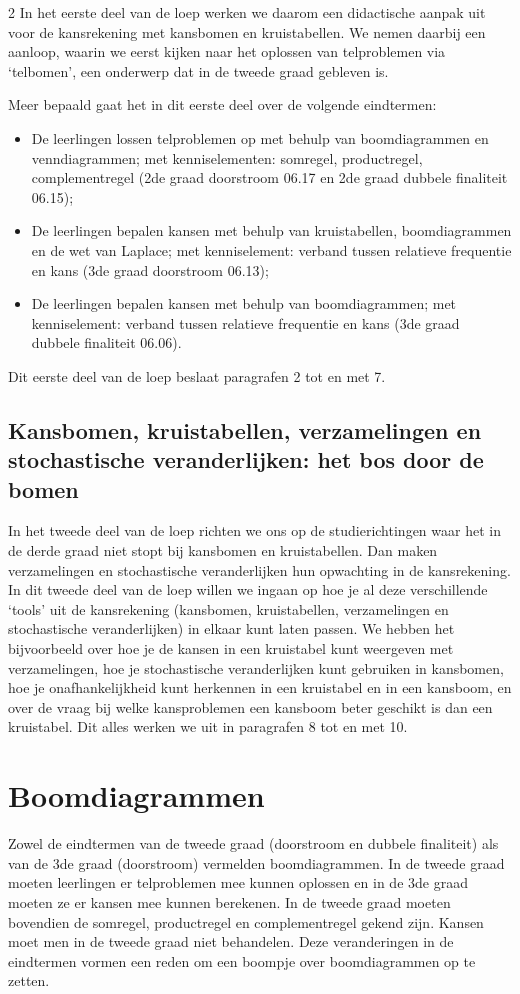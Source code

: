 \begin{multicols}{2}
In het eerste deel van de loep werken we daarom een didactische aanpak uit voor de kansrekening met kansbomen en kruistabellen. We nemen daarbij een aanloop, waarin we eerst kijken naar het oplossen van telproblemen via ‘telbomen’, een onderwerp dat in de tweede graad gebleven is.

Meer bepaald gaat het in dit eerste deel over de volgende eindtermen:
\begin{itemize}
    \item De leerlingen lossen telproblemen op met behulp van boomdiagrammen en venndiagrammen; met kenniselementen: somregel, productregel, complementregel (2de graad doorstroom 06.17 en 2de graad dubbele finaliteit 06.15);
    \item De leerlingen bepalen kansen met behulp van kruistabellen, boomdiagrammen en de wet van Laplace; met kenniselement: verband tussen relatieve frequentie en kans (3de graad doorstroom 06.13);
    \item De leerlingen bepalen kansen met behulp van boomdiagrammen; met kenniselement: verband tussen relatieve frequentie en kans (3de graad dubbele finaliteit 06.06).
\end{itemize}
Dit eerste deel van de loep beslaat paragrafen 2 tot en met 7.

\subsection*{Kansbomen, kruistabellen, verzamelingen en stochastische veranderlijken: het bos door de bomen}

In het tweede deel van de loep richten we ons op de studierichtingen waar het in de derde graad niet stopt bij kansbomen en kruistabellen. Dan maken verzamelingen en stochastische veranderlijken hun opwachting in de kansrekening. In dit tweede deel van de loep willen we ingaan op hoe je al deze verschillende ‘tools’ uit de kansrekening (kansbomen, kruistabellen, verzamelingen en stochastische veranderlijken) in elkaar kunt laten passen. We hebben het bijvoorbeeld over hoe je de kansen in een kruistabel kunt weergeven met verzamelingen, hoe je stochastische veranderlijken kunt gebruiken in kansbomen, hoe je onafhankelijkheid kunt herkennen in een kruistabel en in een kansboom, en over de vraag bij welke kansproblemen een kansboom beter geschikt is dan een kruistabel. Dit alles werken we uit in paragrafen 8 tot en met 10.

\section{Boomdiagrammen}
\label{par:boom}
Zowel de eindtermen van de tweede graad (doorstroom en dubbele finaliteit) als van de 3de graad (doorstroom) vermelden boomdiagrammen. In de tweede graad moeten leerlingen er telproblemen mee kunnen oplossen en in de 3de graad moeten ze er kansen mee kunnen berekenen. In de tweede graad moeten bovendien de somregel, productregel en complementregel gekend zijn. Kansen moet men in de tweede graad niet behandelen. Deze veranderingen in de eindtermen vormen een reden om een boompje over boomdiagrammen op te zetten.


\end{multicols}
